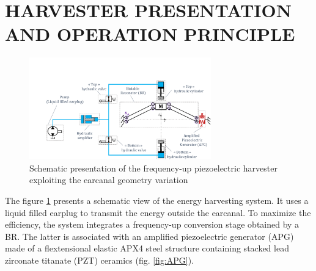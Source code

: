 \documentclass[3p,twocolumn,preprint]{elsarticle}
\begin{document}
\section{HARVESTER PRESENTATION AND OPERATION \mbox{PRINCIPLE}}
\label{sec:HARVESTER PRESENTATION AND OPERATION PRINCIPLE}
\begin{figure}[!htbp]
	\centering
	\captionsetup{justification=centering}
	\includegraphics[trim={3.2cm 0cm 0cm 4.3cm},clip, width=0.7\textwidth]{figures/system_presentation.pdf}
	\caption{Schematic presentation of the frequency-up piezoelectric harvester exploiting the earcanal geometry variation} 
	\label{fig:system_presentation}
\end{figure}
The figure \ref{fig:system_presentation} presents a schematic view of the energy harvesting system. It uses a liquid filled earplug to transmit the energy outside the earcanal. To maximize the efficiency, the system integrates a frequency-up conversion stage obtained by a BR. The latter is associated with an amplified piezoelectric generator (APG) \cite{CEDRATTECHNOLOGIES2022} made of a flextensional elastic APX4 steel \cite{AUBERT&DUVAL2022} structure containing stacked lead zirconate titanate (PZT) ceramics (fig. \ref{fig:APG}).
\end{document}
